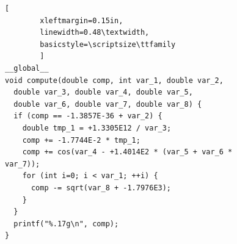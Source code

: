 \documentclass[11pt,letterpaper]{article}
\begin{document}
\begin{figure}[H]
    \begin{lstlisting}[
        xleftmargin=0.15in,
        linewidth=0.48\textwidth, 
        basicstyle=\scriptsize\ttfamily
        ] 
__global__
void compute(double comp, int var_1, double var_2,
  double var_3, double var_4, double var_5, 
  double var_6, double var_7, double var_8) {
  if (comp == -1.3857E-36 + var_2) {
    double tmp_1 = +1.3305E12 / var_3;
    comp += -1.7744E-2 * tmp_1;
    comp += cos(var_4 - +1.4014E2 * (var_5 + var_6 * var_7));
    for (int i=0; i < var_1; ++i) {
      comp -= sqrt(var_8 + -1.7976E3);
    }
  }
  printf("%.17g\n", comp);
}
\end{lstlisting}
\end{figure}


\begin{biblio}
\lipsum[4]
\end{biblio}
\end{document}
